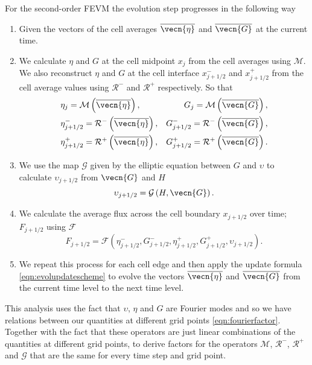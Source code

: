 For the second-order FEVM the evolution step progresses in the following way
\begin{enumerate}
	\item Given the vectors of the cell averages $\overline{\vecn{\eta}}$ and $\overline{\vecn{G}}$ at the current time.
	\item We calculate $\eta$ and $G$ at the cell midpoint $x_{j}$ from the cell averages using $\mathcal{M}$. We also reconstruct $\eta$ and $G$ at the cell interface $x^-_{j+1/2}$ and $x^+_{j+1/2}$ from the cell average values using $\mathcal{R}^{-}$ and $\mathcal{R}^{+}$ respectively. So that
	\begin{align*}	&\eta_j = \mathcal{M}\left(\overline{\vecn{\eta}}\right),& G_j = \mathcal{M}\left(\overline{\vecn{G}}\right),\\
	&\eta^-_{j+1/2} = \mathcal{R}^{-}\left(\overline{\vecn{\eta}}\right),  &G^-_{j+1/2} = \mathcal{R}^{-}\left(\overline{\vecn{G}}\right), \\
	&\eta^+_{j+1/2} = \mathcal{R}^{+}\left(\overline{\vecn{\eta}}\right),  &G^+_{j+1/2} = \mathcal{R}^{+}\left(\overline{\vecn{G}}\right). \\	
	\end{align*}
	\item We use the map $\mathcal{G}$ given by the elliptic equation between $G$ and $\upsilon$ to calculate $\upsilon_{j+1/2} $ from ${\vecn{G}}$ and $H$
	\[\upsilon_{j+1/2} = \mathcal{G}\left(H, {\vecn{G}}\right).\]
	\item We calculate the average flux across the cell boundary $x_{j+1/2}$ over time; $F_{j+1/2}$ using $\mathcal{F}$
	\[F_{j+1/2} =\mathcal{F} \left(\eta^-_{j+1/2}, G^-_{j+1/2},\eta^+_{j+1/2}, G^+_{j+1/2},\upsilon_{j+1/2}  \right). \]
	\item We repeat this process for each cell edge and then apply the update formula \eqref{eqn:evolupdatescheme} to evolve the vectors $\overline{\vecn{\eta}}$ and $\overline{\vecn{G}}$ from the current time level to the next time level.
\end{enumerate}
This analysis uses the fact that $\upsilon$, $\eta$ and $G$ are Fourier modes and so we have relations between our quantities at different grid points \eqref{eqn:fourierfactor}. Together with the fact that these operators are just linear combinations of the quantities at different grid points, to derive factors for the operators $\mathcal{M}$, $\mathcal{R}^{-}$, $\mathcal{R}^{+}$ and $\mathcal{G}$ that are the same for every time step and grid point.

